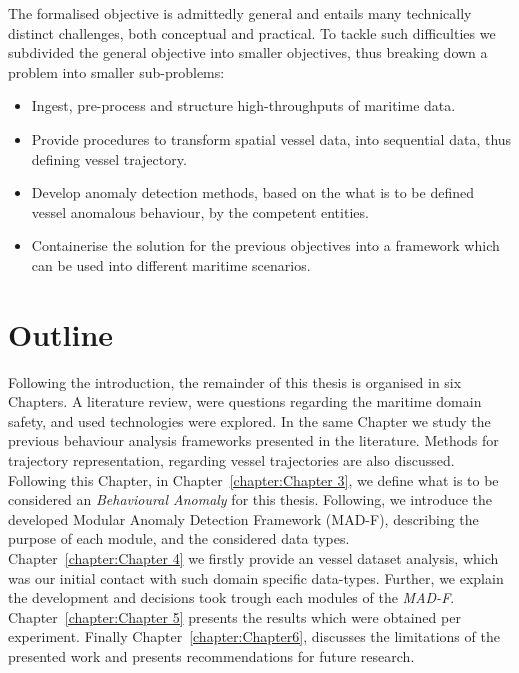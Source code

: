 The formalised objective is admittedly general and entails many technically distinct challenges, both conceptual and practical. To tackle such difficulties we subdivided the general objective into smaller objectives, thus breaking down a problem into smaller sub-problems: 

\begin{itemize}
\item Ingest, pre-process and structure high-throughputs of maritime data.
\item Provide procedures to transform spatial vessel data, into sequential data, thus defining vessel trajectory.
\item Develop anomaly detection methods, based on the what is to be defined vessel anomalous behaviour, by the competent entities.
\item Containerise the solution for the previous objectives into a framework which can be used into different maritime scenarios.  
\end{itemize}

\section{Outline}
Following the introduction, the remainder of this thesis is organised in six Chapters. A literature review, were questions regarding the maritime domain safety, and used technologies were explored. In the same Chapter we study the previous behaviour analysis frameworks presented in the literature. Methods for trajectory representation, regarding vessel trajectories are also discussed. Following this Chapter, in Chapter~\ref{chapter:Chapter 3}, we define what is to be considered an \emph{Behavioural Anomaly} for this thesis. Following, we introduce the developed Modular Anomaly Detection Framework (MAD-F), describing the purpose of each module, and the considered data types. Chapter~\ref{chapter:Chapter 4} we firstly provide an vessel dataset analysis, which was our initial contact with such domain specific data-types. Further, we explain the development and decisions took trough each modules of the \emph{MAD-F}. Chapter~\ref{chapter:Chapter 5} presents the results which were obtained per experiment. Finally Chapter~\ref{chapter:Chapter6}, discusses the limitations of the presented work and presents recommendations for future research.




